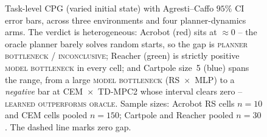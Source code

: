 \begin{figure}[t]
  \caption{Task-level CPG (varied initial state) with Agresti--Caffo $95\%$ CI error bars, across three environments and four planner-dynamics arms. The verdict is heterogeneous: Acrobot (red) sits at $\approx 0$ -- the oracle planner barely solves random starts, so the gap is \textsc{planner bottleneck} / \textsc{inconclusive}; Reacher (green) is strictly positive \textsc{model bottleneck} in every cell; and Cartpole size~5 (blue) spans the range, from a large \textsc{model bottleneck} (RS~$\times$~MLP) to a \emph{negative} bar at CEM~$\times$~TD-MPC2 whose interval clears zero -- \textsc{learned outperforms oracle}. Sample sizes: Acrobot RS cells $n = 10$ and CEM cells pooled $n = 150$; Cartpole and Reacher pooled $n = 30$. The dashed line marks zero gap.}
  \label{fig:cross_env_cpg}
\end{figure}
